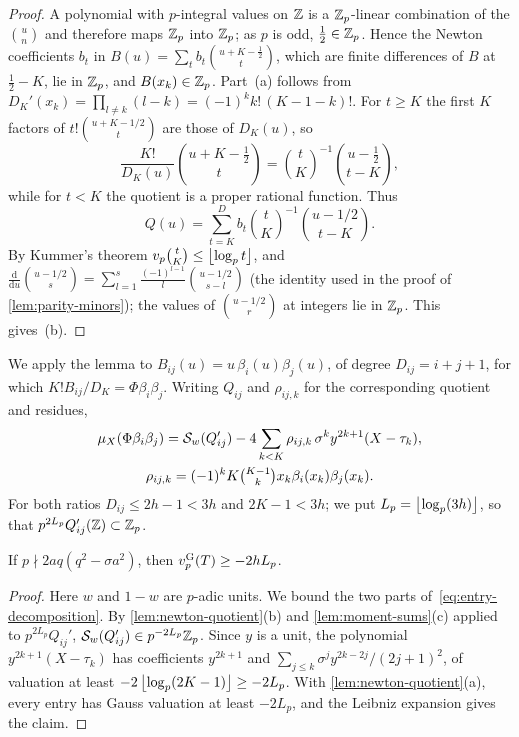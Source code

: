 \begin{proof}
A polynomial with $p$-integral values on $\mathbb{Z}$ is a $\mathbb{Z}_p$-linear combination of the $\binom un$
and therefore maps $\mathbb{Z}_p$ into $\mathbb{Z}_p$; as $p$ is odd, $\frac12\in\mathbb{Z}_p$. Hence the Newton
coefficients $b_t$ in $B(u)=\sum_tb_t\binom{u+K-\frac12}{t}$, which are finite differences of
$B$ at $\frac12-K$, lie in $\mathbb{Z}_p$, and $B(x_k)\in\mathbb{Z}_p$. Part~(a) follows from
$D_K'(x_k)=\prod_{l\ne k}(l-k)=(-1)^kk!\,(K-1-k)!$. For $t\ge K$ the first $K$ factors of
$t!\binom{u+K-1/2}{t}$ are those of $D_K(u)$, so
\[
  \frac{K!}{D_K(u)}\binom{u+K-\frac12}{t}=\binom{t}{K}^{-1}\binom{u-\frac12}{t-K},
\]
while for $t<K$ the quotient is a proper rational function. Thus
\[
  Q(u)=\sum_{t=K}^{D}b_t\binom tK^{-1}\binom{u-1/2}{t-K}.
\]
By Kummer's theorem
$v_p\binom tK\le\left\lfloor \log_pt\right\rfloor$, and
$\frac{\mathrm d}{\mathrm du}\binom{u-1/2}{s}=\sum_{l=1}^{s}\frac{(-1)^{l-1}}{l}\binom{u-1/2}{s-l}$
(the identity used in the proof of \cref{lem:parity-minors}); the values of $\binom{u-1/2}{r}$
at integers lie in $\mathbb{Z}_p$. This gives~(b).
\end{proof}

We apply the lemma to $B_{ij}(u)=u\,\beta_i(u)\beta_j(u)$, of degree $D_{ij}=i+j+1$, for which
$K!B_{ij}/D_K=\Phi\beta_i\beta_j$. Writing $Q_{ij}$ and $\rho_{ij,k}$ for the corresponding
quotient and residues,
\begin{equation}\label{eq:entry-decomposition}
  \begin{gathered}
  \mu_X(\Phi\beta_i\beta_j)=\mathcal{S}_w(Q_{ij}')-4\sum_{k<K}\rho_{ij,k}\,\sigma^ky^{2k+1}(X-\tau_k),\\
  \rho_{ij,k}=(-1)^kK\tbinom{K-1}{k}x_k\beta_i(x_k)\beta_j(x_k).\end{gathered}
\end{equation}
For both ratios $D_{ij}\le2h-1<3h$ and $2K-1<3h$; we put $L_p=\left\lfloor \log_p(3h)\right\rfloor$, so that
$p^{2L_p}Q_{ij}'(\mathbb{Z})\subset\mathbb{Z}_p$.

\begin{proposition}\label{prop:uniform}
If $p\nmid 2aq(q^2-\sigma a^2)$, then $v_{p}^{\mathrm{G}}(T)\ge-2hL_p$.
\end{proposition}

\begin{proof}
Here $w$ and $1-w$ are $p$-adic units. We bound the two parts of~\eqref{eq:entry-decomposition}.
By \cref{lem:newton-quotient}(b) and \cref{lem:moment-sums}(c) applied to $p^{2L_p}Q_{ij}'$,
$\mathcal{S}_w(Q_{ij}')\in p^{-2L_p}\mathbb{Z}_p$. Since $y$ is a unit, the polynomial $y^{2k+1}(X-\tau_k)$ has
coefficients $y^{2k+1}$ and $\sum_{j\le k}\sigma^jy^{2k-2j}/(2j+1)^2$, of valuation at least
$-2\left\lfloor \log_p(2K-1)\right\rfloor\ge-2L_p$. With \cref{lem:newton-quotient}(a), every entry has Gauss
valuation at least $-2L_p$, and the Leibniz expansion gives the claim.
\end{proof}

